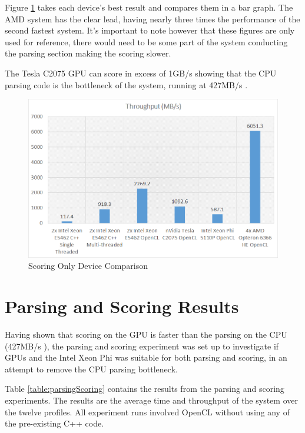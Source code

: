Figure \ref{fig:scoringOnlyBest} takes each device's best result and compares
them in a bar graph. The AMD system has the clear lead, having nearly three
times the performance of the second fastest system. It's important to note
however that these figures are only used for reference, there would need to
be some part of the system conducting the parsing section making the scoring
slower.

The Tesla C2075 GPU can score in excess of 1GB/s showing that the CPU parsing
code is the bottleneck of the system, running at 427MB/s \cite{HybridCPUFPGA}.

\begin{figure}[H]
\centering
\includegraphics[width=\linewidth]{images/scoringOnlyBest.png}
\caption{Scoring Only Device Comparison}
\label{fig:scoringOnlyBest}
\end{figure}

\section{Parsing and Scoring Results}

Having shown that scoring on the GPU is faster than the parsing on the CPU
(427MB/s \cite{HybridCPUFPGA}), the parsing and scoring experiment was set up
to investigate if GPUs and the Intel Xeon Phi was suitable for both parsing
and scoring, in an attempt to remove the CPU parsing bottleneck.

Table \ref{table:parsingScoring} contains the results from the parsing and
scoring experiments. The results are the average time and throughput of the
system over the twelve profiles. All experiment runs involved OpenCL without
using any of the pre-existing C++ code.

